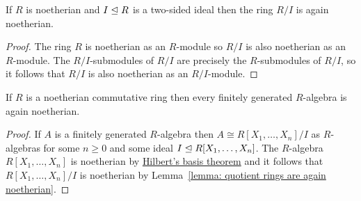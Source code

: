 \begin{lemma}
  \label{lemma: quotient rings are again noetherian}
  If $R$ is noetherian and $I \trianglelefteq R$ is a two-sided ideal then the ring $R/I$ is again noetherian.
\end{lemma}


\begin{proof}
  The ring $R$ is noetherian as an $R$-module so $R/I$ is also noetherian as an $R$-module.
  The $R/I$-submodules of $R/I$ are precisely the $R$-submodules of $R/I$, so it follows that $R/I$ is also noetherian as an $R/I$-module.
\end{proof}


\begin{corollary}
  \label{corollary: finite type preserves noetherian}
  If $R$ is a noetherian commutative ring then every finitely generated $R$-algebra is again noetherian.
\end{corollary}


\begin{proof}
  If $A$ is a finitely generated $R$-algebra then $A \cong R[X_1, \dotsc, X_n]/I$ as $R$-algebras for some $n \geq 0$ and some ideal $I \trianglelefteq R[X_1, \dotsc, X_n]$.
  The $R$-algebra $R[X_1, \dotsc, X_n]$ is noetherian by \hyperref[theorem: Hilberts basis theorem]{Hilbert's basis theorem} and it follows that $R[X_1, \dotsc, X_n]/I$ is noetherian by Lemma~\ref{lemma: quotient rings are again noetherian}.
\end{proof}
